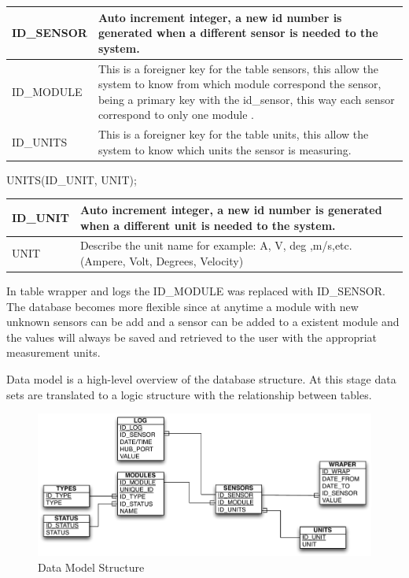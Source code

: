 \begin{table}[H]
\centering
	\begin{tabular}{| p{2cm} | p{10cm} |}
		\hline
		ID\_SENSOR & Auto increment integer, a new id number is generated when a different sensor is needed to the system. \\\hline
		ID\_MODULE & This is a foreigner key for the table sensors, this allow the system to know from which module correspond the sensor, being a primary key with the id\_sensor, this way each sensor correspond to only one module .\\\hline
		ID\_UNITS & This is a foreigner key for the table units, this allow the system to know which units the sensor is measuring.\\\hline
	\end{tabular}
\end{table}

UNITS(ID\_UNIT, UNIT);

\begin{table}[H]
\centering
	\begin{tabular}{| p{2cm} | p{10cm} |}
		\hline
		ID\_UNIT & Auto increment integer, a new id number is generated when a different unit is needed to the system. \\\hline
		UNIT & Describe the unit name for example: A, V, deg ,m/s,etc. (Ampere, Volt, Degrees, Velocity)\\\hline
	\end{tabular}
\end{table}

In table wrapper and logs the ID\_MODULE was replaced with ID\_SENSOR. The database becomes more flexible since at anytime a module with new unknown sensors can be add and a sensor can be added to a existent module and the values will always be saved and retrieved to the user with the appropriat measurement units.

Data model is a high-level overview of the database structure. At this stage data sets are translated to a logic structure with the relationship between tables.

\begin{figure}[H]
	\begin{centering}
		\includegraphics[width=1.0\textwidth]{images/db_structure.pdf}
		\caption{Data Model Structure}
	\end{centering}
\end{figure}


